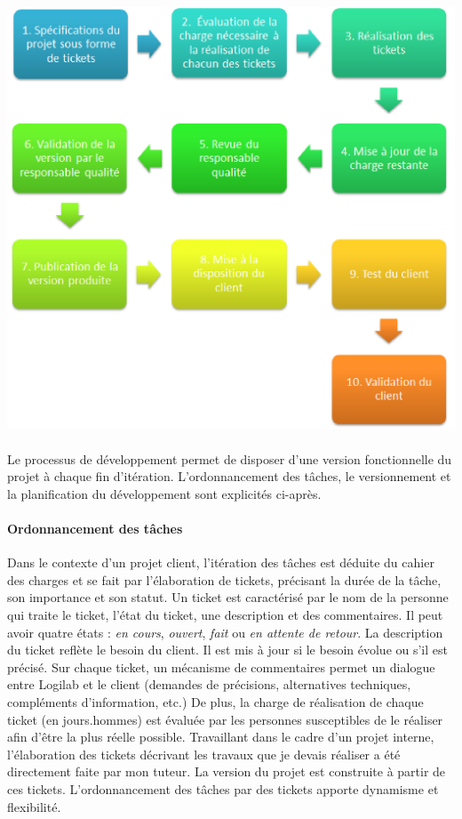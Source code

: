 \documentclass {report}
\begin{document}
\begin{center}
\includegraphics[scale=0.5]{iteration.png}
\end{center}

\paragraph{}
Le processus de développement permet de disposer d’une version fonctionnelle du projet à chaque fin d’itération. L'ordonnancement des tâches, le versionnement et la planification du développement sont explicités ci-après.



\paragraph{Ordonnancement des tâches}
Dans le contexte d'un projet client, l'itération des tâches est déduite du cahier des charges et se fait par l'élaboration de tickets, précisant la durée de la tâche, son importance et son statut. Un ticket est caractérisé par le nom de la personne qui traite le ticket, l'état du ticket, une description et des commentaires. Il peut avoir quatre états : \textit{en cours}, \textit{ouvert}, \textit{fait} ou \textit{en attente de retour}. La description du ticket reflète le besoin du client. Il est mis à jour si le besoin évolue ou s'il est précisé. Sur chaque ticket, un mécanisme de commentaires permet un dialogue entre Logilab et le client (demandes de précisions, alternatives techniques, compléments d’information, etc.) De plus, la charge de réalisation de chaque ticket (en jours.hommes) est évaluée par les personnes susceptibles de le réaliser afin d'être la plus réelle possible. Travaillant dans le cadre d'un projet interne, l'élaboration des tickets décrivant les travaux que je devais réaliser a été directement faite par mon tuteur. La version du projet est construite à partir de ces tickets. L'ordonnancement des tâches par des tickets apporte dynamisme et flexibilité.
\end{document}
